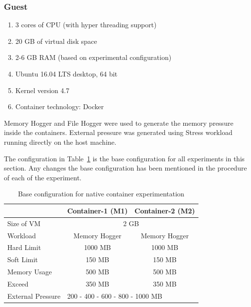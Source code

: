       \subsubsection{Guest}
	
	\begin{enumerate}
	  \item 3 cores of CPU (with hyper threading support)
	  \item 20 GB of virtual disk space
	  \item 2-6 GB RAM (based on experimental configuration)
	  \item Ubuntu 16.04 LTS desktop, 64 bit
	  \item Kernel version 4.7
	  \item Container technology: Docker
	\end{enumerate}
	
      Memory Hogger and File Hogger were used to generate the memory pressure inside the containers. External pressure was generated 
using Stress workload running directly on the host machine.
  
  
      The configuration in Table~\ref{table_native_base} is the base configuration for all experiments in this section. Any changes the base 
      configuration has been mentioned in the procedure of each of the experiment.

	\begin{table}	 
	  \begin{center}
	    \begin{tabular}{ l | c | c }
	      & Container-1 (M1) & Container-2 (M2) \\ 
	      \hline
	      \hline
	      Size of VM & \multicolumn{2}{c}{2 GB} \\	      
	      \hline
	      Workload & Memory Hogger & Memory Hogger \\
	      \hline
	      Hard Limit & 1000 MB & 1000 MB \\  
	      \hline
	      Soft Limit & 150 MB & 150 MB \\  
	      \hline
	      Memory Usage & 500 MB & 500 MB \\
	      \hline
	      Exceed & 350 MB & 350 MB \\
	      \hline 
	      External Pressure & \multicolumn{2}{l}{ 200 - 400 - 600 - 800 - 1000 MB} \\
	    \end{tabular}	    
	    \caption{Base configuration for native container experimentation}
	    \label{table_native_base}
	  \end{center}
	\end{table}
	
